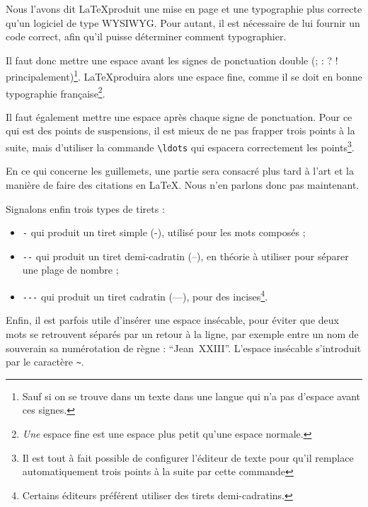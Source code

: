 Nous l'avons dit \LaTeX produit une mise en page et une typographie plus correcte qu'un logiciel de type WYSIWYG. Pour autant, il est nécessaire de lui fournir un code correct, afin qu'il puisse déterminer comment typographier.

Il faut donc mettre une espace avant les signes de ponctuation double (; : ? ! principalement)\footnote{Sauf si on se trouve dans un texte dans une langue qui n'a pas d'espace avant ces signes.}. \LaTeX produira alors une espace fine, comme il se doit en bonne typographie fran\c caise\footnote{\emph{Une} espace fine est une espace plus petit qu'une espace normale.}.

Il faut également mettre une espace après chaque signe de ponctuation. Pour ce qui est des points de suspensions, il est mieux de ne pas frapper trois points à la suite, mais d'utiliser la commande \verb|\ldots| qui espacera correctement les points\footnote{Il est tout à fait possible de configurer l'éditeur de texte pour qu'il remplace automatiquement trois points à la suite par cette commande}.

En ce qui concerne les guillemets, une partie sera consacré plus tard à l'art et la manière de faire des citations en \LaTeX. Nous n'en parlons donc pas maintenant.

Signalons enfin trois types de tirets :
\begin{itemize}
\item \verb|-| qui produit un tiret simple (-), utilisé pour les mots composés ;
\item \verb|--| qui produit un tiret demi-cadratin (--), en théorie à utiliser pour séparer une plage de nombre ;
\item \verb|---| qui produit un tiret cadratin (---), pour des incises\footnote{Certains éditeurs préférent utiliser des tirets demi-cadratins.}.
\end{itemize}
 
Enfin, il est parfois utile d'insérer une espace insécable, pour éviter que deux mots se retrouvent séparés par un retour à la ligne, par exemple entre un nom de souverain sa numérotation de règne : \enquote{Jean~XXIII}.  L'espace insécable s'introduit par le caractère \verb|~|.



